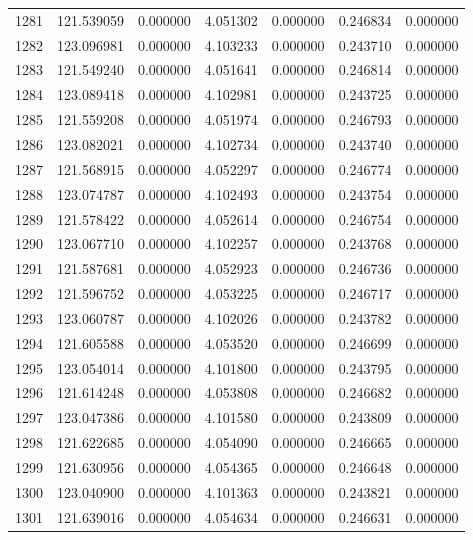 \begin{tabular}{rrrrrrr}
1281 & 121.539059 &    0.000000 &  4.051302 &   0.000000 &   0.246834 &  0.000000 \\
1282 & 123.096981 &    0.000000 &  4.103233 &   0.000000 &   0.243710 &  0.000000 \\
1283 & 121.549240 &    0.000000 &  4.051641 &   0.000000 &   0.246814 &  0.000000 \\
1284 & 123.089418 &    0.000000 &  4.102981 &   0.000000 &   0.243725 &  0.000000 \\
1285 & 121.559208 &    0.000000 &  4.051974 &   0.000000 &   0.246793 &  0.000000 \\
1286 & 123.082021 &    0.000000 &  4.102734 &   0.000000 &   0.243740 &  0.000000 \\
1287 & 121.568915 &    0.000000 &  4.052297 &   0.000000 &   0.246774 &  0.000000 \\
1288 & 123.074787 &    0.000000 &  4.102493 &   0.000000 &   0.243754 &  0.000000 \\
1289 & 121.578422 &    0.000000 &  4.052614 &   0.000000 &   0.246754 &  0.000000 \\
1290 & 123.067710 &    0.000000 &  4.102257 &   0.000000 &   0.243768 &  0.000000 \\
1291 & 121.587681 &    0.000000 &  4.052923 &   0.000000 &   0.246736 &  0.000000 \\
1292 & 121.596752 &    0.000000 &  4.053225 &   0.000000 &   0.246717 &  0.000000 \\
1293 & 123.060787 &    0.000000 &  4.102026 &   0.000000 &   0.243782 &  0.000000 \\
1294 & 121.605588 &    0.000000 &  4.053520 &   0.000000 &   0.246699 &  0.000000 \\
1295 & 123.054014 &    0.000000 &  4.101800 &   0.000000 &   0.243795 &  0.000000 \\
1296 & 121.614248 &    0.000000 &  4.053808 &   0.000000 &   0.246682 &  0.000000 \\
1297 & 123.047386 &    0.000000 &  4.101580 &   0.000000 &   0.243809 &  0.000000 \\
1298 & 121.622685 &    0.000000 &  4.054090 &   0.000000 &   0.246665 &  0.000000 \\
1299 & 121.630956 &    0.000000 &  4.054365 &   0.000000 &   0.246648 &  0.000000 \\
1300 & 123.040900 &    0.000000 &  4.101363 &   0.000000 &   0.243821 &  0.000000 \\
1301 & 121.639016 &    0.000000 &  4.054634 &   0.000000 &   0.246631 &  0.000000 \\

\end{tabular}
